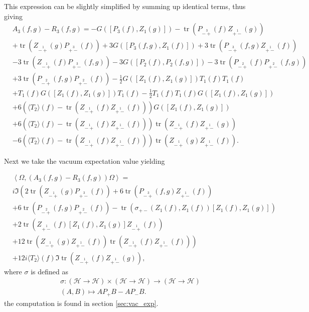 \documentclass[oneside,reqno,12pt]{amsart}
\DeclareMathOperator{\tr}{tr}
\newcommand{\Z}[2]{Z_{\stackrel{1}{#1}}\left(#2\right)}
\begin{document}
This expression can be slightly simplified by summing up identical terms, thus giving
\begin{align}\tag*{}
&A_3(f,g)-R_3(f,g)=
-  G\left(\left[P_3(f),Z_1(g)\right]\right) 
-\tr\left(P_{\stackrel{3}{-+}}(f) \Z{+-}{g}\right)\\\tag*{}
&+\tr\left(\Z{-+}{g}P_{\stackrel{3}{+-}}(f) \right)
+3 G\left(\left[P_3(f,g), Z_1(f)\right]\right)
+3 \tr\left(  P_{\stackrel{3}{-+}}(f,g) \Z{+-}{f}\right)\\\tag*{}
&-3 \tr\left(  \Z{-+}{f} P_{\stackrel{3}{+-}}(f,g) \right)
-3G\left(\left[P_2(f),P_2(f,g)\right]\right)
-3 \tr\left(P_{\stackrel{2}{-+}}(f) P_{\stackrel{2}{+-}}(f,g)\right)\\\tag*{}
&+3 \tr\left(P_{\stackrel{2}{-+}}(f,g) P_{\stackrel{2}{+-}}(f)\right)
-\frac{1}{2} G\left(\left[Z_1(f),Z_1(g)\right]\right) T_1(f) T_1(f)\\\tag*{}
&+ T_1(f) G\left(\left[Z_1(f),Z_1(g)\right]\right) T_1(f)
-\frac{1}{2} T_1(f)T_1(f) G\left(\left[Z_1(f),Z_1(g)\right]\right)\\\tag*{}
&+6 \left( \langle T_2\rangle(f) -\tr \left(\Z{-+}{f}\Z{+-}{f}\right)\right) G\left(\left[Z_1(f),Z_1(g)\right]\right)\\\tag*{}
&+6 \left( \langle T_2\rangle(f) -\tr \left(\Z{-+}{f}\Z{+-}{f}\right)\right) \tr\left(\Z{-+}{f} \Z{+-}{g}\right)\\\label{pre_vac_exp}
&-6 \left( \langle T_2\rangle(f) -\tr \left(\Z{-+}{f}\Z{+-}{f}\right)\right) \tr\left(\Z{-+}{g} \Z{+-}{f}\right)
.\end{align}



Next we take the vacuum expectation value yielding

\begin{align}\tag*{}
&\left<\Omega, (A_3(f,g)-R_3(f,g))\Omega \right>=\\\tag*{}
&i \Im \left( 2\tr\left(\Z{-+}{g}P_{\stackrel{3}{+-}}(f) \right)
+6 \tr\left(  P_{\stackrel{3}{-+}}(f,g) \Z{+-}{f}\right)\right.\\\tag*{}
&+6 \tr\left(P_{\stackrel{2}{-+}}(f,g) P_{\stackrel{2}{+-}}(f)\right)
- \tr\left( \sigma_{+-}\left(Z_1(f),Z_1(f)\right) \left[Z_1(f),Z_1(g)\right] \right)\\\tag*{}
&+2 \tr\left(\Z{+-}{f} \left[Z_1(f),Z_1(g)\right] \Z{-+}{f}\right)\\\tag*{}
&\left.+12 \tr \left(\Z{-+}{g}\Z{+-}{f}\right)\tr\left( \Z{-+}{f} \Z{+-}{f}\right)\right)\\\label{pre_fourier_int}
&+12 i  \langle T_2\rangle(f)\Im  \tr\left(\Z{-+}{f} \Z{+-}{g}\right)
,\end{align}
where \(\sigma\) is defined as
\begin{align*}
\sigma: \left(\mathcal{H}\rightarrow\mathcal{H}\right)\times\left(\mathcal{H}\rightarrow\mathcal{H}\right)\rightarrow \left( \mathcal{H}\rightarrow\mathcal{H}\right)\\
\left(A,B\right)\mapsto A P_+B - AP_- B.
\end{align*}
the computation is found in section \ref{sec:vac_exp}.
\end{document}
